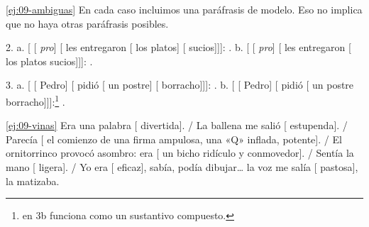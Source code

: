 \begin{solucion}{\ref{ej:09-ambiguas}}
En cada caso incluimos una paráfrasis de modelo. Eso no implica que no haya
otras paráfrasis posibles.

2. a. [ [ \textit{pro}] [ les
entregaron [ los platos] [
sucios]]]: . b. [
[ \textit{pro}] [ les entregaron
[ los platos sucios]]]: .

3. a. [ [ Pedro] [ pidió
[ un postre] [
borracho]]]: . b.
[ [ Pedro] [ pidió
[ un postre borracho]]]:\footnote{ en 3b funciona como un sustantivo compuesto.} .
\end{solucion}

\begin{solucion}{\ref{ej:09-vinas}}
Era una palabra [ divertida]. / La ballena me salió [
estupenda]. / Parecía [ el comienzo de una firma ampulosa, una «Q»
inflada, potente]. / El ornitorrinco provocó asombro: era [ un bicho
ridículo y conmovedor]. / Sentía la mano [ ligera]. / Yo era [
eficaz], sabía, podía dibujar\ldots{} la voz me salía [ pastosa], la
matizaba.
\end{solucion}
